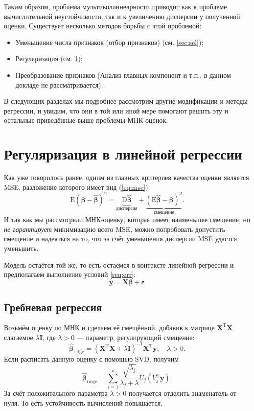 \documentclass[12pt,a4paper,final]{article}
\newcommand{\betah}{\hat{\bm \beta}}
\newcommand{\betaa}{\bm{\beta}}
\newcommand{\epss}{\bm{\varepsilon}}
\newcommand{\E}{\mathrm{E}}
\newcommand{\XT}{{\bm{X}}^{\mathrm{T}}}
\newcommand{\X}{\bm{X}}
\newcommand{\1}{\mathds{1}}
\begin{document}
Таким образом, проблема мультиколлинеарности приводит как к проблеме вычислительной неустойчивости, так и к увеличению дисперсии у полученной оценки. Существует несколько методов борьбы с этой проблемой:
\begin{itemize}
	\item Уменьшение числа признаков (отбор признаков) (см. \ref{sec:sel});
	\item Регуляризация (см. \ref{sec:reg});
	\item Преобразование признаков (Анализ главных компонент и т.п., в данном докладе не рассматривается).
\end{itemize}
В следующих разделах мы подробнее рассмотрим другие модификации и методы регрессии, и увидим, что они в той или иной мере помогают решить эту и остальные приведённые выше проблемы МНК-оценок.

\section{Регуляризация в линейной регрессии}
\label{sec:reg}
Как уже говорилось ранее, одним из главных критериев качества оценки является MSE, разложение которого имеет вид (\ref{eq:mse})
$$
\E(\betaa - \betah)^2 = \underbrace{\mathrm D \betah}_{\text{дисперсия}} + \underbrace{(\mathrm E \betah - \betaa)^2}_{\text{смещение}}.
$$
И так как мы рассмотрели МНК-оценку, которая имеет наименьшее смещение, но \textit{не гарантирует} минимизацию всего MSE, можно попробовать допустить смещение и надеяться на то, что за счёт уменьшения дисперсии MSE удастся уменьшить. 

Модель остаётся той же, то есть остаёмся в контексте линейной регрессии и предполагаем выполнение условий \ref{req:err}:
$$
\bm y = \X \betaa + \epss
$$

\subsection{Гребневая регрессия}
	
Возьмём оценку по МНК и сделаем её смещённой, добавив к матрице $\XT \X$ слагаемое $\lambda \mathbf I$, где $\lambda > 0$ --- параметр, регулирующий смещение:
\begin{equation}
\label{eq:ridge}
  \betah_{\text{ridge}} = (\XT \X + \lambda \mathbf I)^{-1}\XT\bm y,\quad \lambda > 0.
\end{equation}
	Если расписать данную оценку с помощью SVD, получим
	$$\betah_{\text{ridge}} = \sum_{i = 1}^n \frac{\sqrt{\lambda_j}}{\lambda_j + \lambda} U_j(V_j^\mathrm T\bm y).$$
За счёт положительного параметра $\lambda >0$ получается отделить знаменатель от нуля. То есть устойчивость вычислений повышается. 
\end{document}
